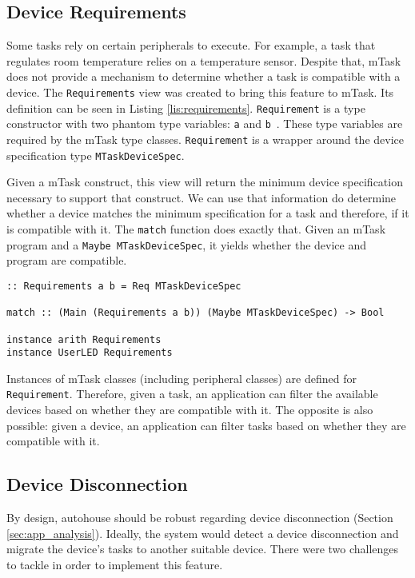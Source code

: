 \subsection{Device Requirements}

Some tasks rely on certain peripherals to execute. For example, a task that regulates room temperature relies on a temperature sensor. Despite that, \gls{mTask} does not provide a mechanism to determine whether a task is compatible with a device. The \texttt{Requirements} view was created to bring this feature to \gls{mTask}. Its definition can be seen in Listing \ref{lis:requirements}. \texttt{Requirement} is a type constructor with two phantom type variables: \texttt{a} and \texttt{b}~\cite{phantom}. These type variables are required by the \gls{mTask} type classes. \texttt{Requirement} is a wrapper around the device specification type \texttt{MTaskDeviceSpec}. 

Given a \gls{mTask} construct, this view will return the minimum device specification necessary to support that construct. We can use that information do determine whether a device matches the minimum specification for a task and therefore, if it is compatible with it. The \texttt{match} function does exactly that. Given an \gls{mTask} program and a \texttt{Maybe MTaskDeviceSpec}, it yields whether the device and program are compatible.

\begin{lstlisting}[caption=The \texttt{Requirements} view,captionpos=b,label=lis:requirements]
:: Requirements a b = Req MTaskDeviceSpec

match :: (Main (Requirements a b)) (Maybe MTaskDeviceSpec) -> Bool

instance arith Requirements
instance UserLED Requirements 
\end{lstlisting}

Instances of \gls{mTask} classes (including peripheral classes) are defined for \texttt{Requirement}. Therefore, given a task, an application can filter the available devices based on whether they are compatible with it. The opposite is also possible: given a device, an application can filter tasks based on whether they are compatible with it.

\subsection{Device Disconnection}

By design, \gls{autohouse} should be robust regarding device disconnection (Section \ref{sec:app_analysis}). Ideally, the system would detect a device disconnection and migrate the device's tasks to another suitable device. There were two challenges to tackle in order to implement this feature. 

